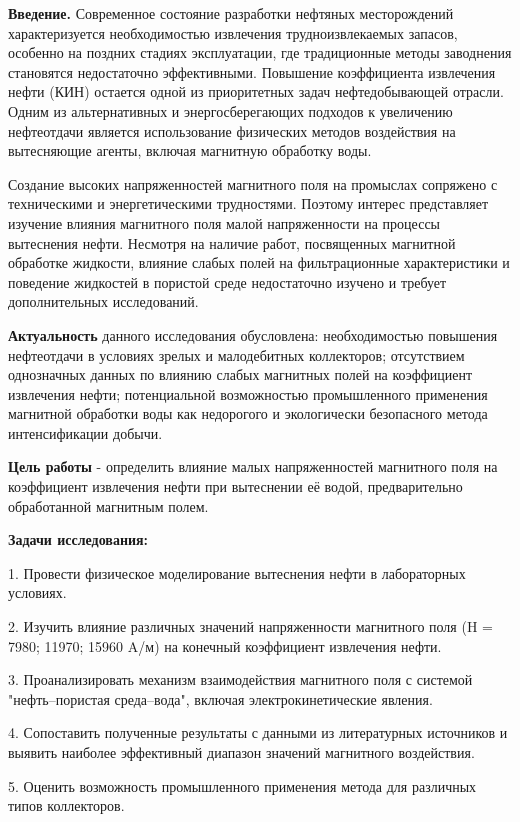 \begin{multicols}{2}
{\bfseries Введение.} Современное состояние разработки нефтяных
месторождений характеризуется необходимостью извлечения
трудноизвлекаемых запасов, особенно на поздних стадиях эксплуатации, где
традиционные методы заводнения становятся недостаточно эффективными.
Повышение коэффициента извлечения нефти (КИН) остается одной из
приоритетных задач нефтедобывающей отрасли. Одним из альтернативных и
энергосберегающих подходов к увеличению нефтеотдачи является
использование физических методов воздействия на вытесняющие агенты,
включая магнитную обработку воды.

Создание высоких напряженностей магнитного поля на промыслах сопряжено с
техническими и энергетическими трудностями. Поэтому интерес представляет
изучение влияния магнитного поля малой напряженности на процессы
вытеснения нефти. Несмотря на наличие работ, посвященных магнитной
обработке жидкости, влияние слабых полей на фильтрационные
характеристики и поведение жидкостей в пористой среде недостаточно
изучено и требует дополнительных исследований.

{\bfseries Актуальность} данного исследования обусловлена: необходимостью
повышения нефтеотдачи в условиях зрелых и малодебитных коллекторов;
отсутствием однозначных данных по влиянию слабых магнитных полей на
коэффициент извлечения нефти; потенциальной возможностью промышленного
применения магнитной обработки воды как недорогого и экологически
безопасного метода интенсификации добычи.

{\bfseries Цель работы} - определить влияние малых напряженностей
магнитного поля на коэффициент извлечения нефти при вытеснении её водой,
предварительно обработанной магнитным полем.

{\bfseries Задачи исследования:}

1. Провести физическое моделирование вытеснения нефти в лабораторных
условиях.

2. Изучить влияние различных значений напряженности магнитного поля (H =
7980; 11970; 15960 A/м) на конечный коэффициент извлечения нефти.

3. Проанализировать механизм взаимодействия магнитного поля с системой
"нефть--пористая среда--вода", включая электрокинетические явления.

4. Сопоставить полученные результаты с данными из литературных источников
и выявить наиболее эффективный диапазон значений магнитного
воздействия.

5. Оценить возможность промышленного применения метода для различных
типов коллекторов.


\end{multicols}
